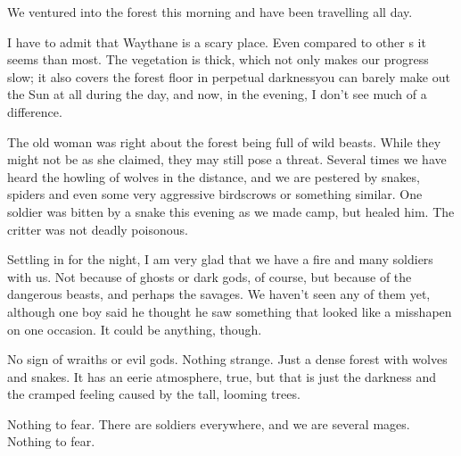 \begin{diary}%
\diarystamp{\dateWaythaneDayOne}

\new
%
We ventured into the forest this morning and have been travelling all day. 

I have to admit that Waythane is a scary place. Even compared to other \Wylde{}s it seems \Wylder{} than most. The vegetation is thick, which not only makes our progress slow; it also covers the forest floor in perpetual darkness\dash you can barely make out the Sun at all during the day, and now, in the evening, I don't see much of a difference. 

The old woman was right about the forest being full of wild beasts. While they might not be  as she claimed, they may still pose a threat. Several times we have heard the howling of wolves in the distance, and we are pestered by snakes, spiders and even some very aggressive birds\dash crows or something similar. One soldier was bitten by a snake this evening as we made camp, but \Orla{} healed him. The critter was not deadly poisonous. 

Settling in for the night, I am very glad that we have a fire and many soldiers with us. Not because of ghosts or dark gods, of course, but because of the dangerous beasts, and perhaps the savages. We haven't seen any of them yet, although one boy said he thought he saw something that looked like a misshapen \meccaran{} on one occasion. It could be anything, though. 

No sign of wraiths or evil gods. Nothing strange. Just a dense forest with wolves and snakes. It has an eerie atmosphere, true, but that is just the darkness and the cramped feeling caused by the tall, looming trees. 

Nothing to fear. There are soldiers everywhere, and we are several mages. Nothing to fear. 

\end{diary}







